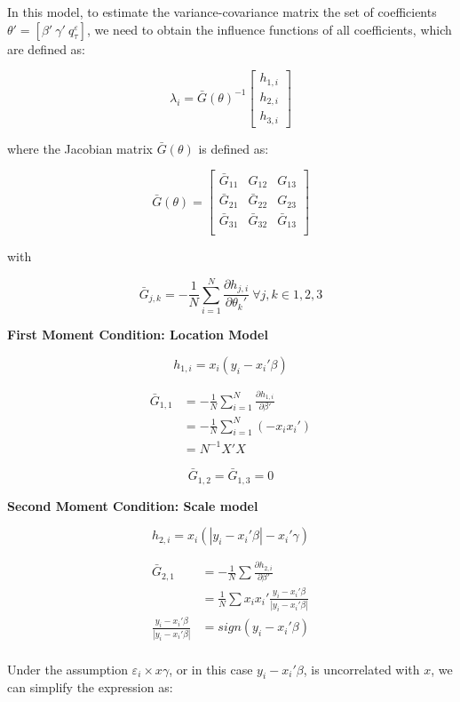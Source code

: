 \documentclass[
  authoryear,
  review,
  1p]{elsarticle}
\begin{document}
In this model, to estimate the variance-covariance matrix the set of
coefficients \(\theta'=[\beta' \ \gamma' \ q^\varepsilon_\tau]\), we
need to obtain the influence functions of all coefficients, which are
defined as:

\[\lambda_i = \bar G(\theta)^{-1}
\begin{bmatrix}
h_{1,i} \\
h_{2,i} \\
h_{3,i}
\end{bmatrix}
\]

where the Jacobian matrix \(\bar G(\theta)\) is defined as:

\[\bar G(\theta) = \begin{bmatrix}
\bar G_{11} & G_{12} & G_{13} \\
\bar G_{21} & \bar G_{22} & G_{23} \\
\bar G_{31} & \bar G_{32} & \bar G_{13} \\
\end{bmatrix}
\]

with

\[\bar G_{j,k} = - \frac 1 N \sum_{i=1}^N \frac{\partial h_{j,i}}{\partial \theta_k'} \ \forall j,k \in 1,2,3
\]

\textbf{First Moment Condition: Location Model}

\[h_{1,i}=x_i(y_i-x_i'\beta)\]

\[\begin{aligned}
\bar G_{1,1} &=- \frac{1}{N} \sum_{i=1}^N \frac{\partial h_{1,i}}{\partial \beta'} \\
             &=- \frac{1}{N} \sum_{i=1}^N (-x_i x_i') \\
             &= N^{-1} X'X
\end{aligned}
\]

\[
\bar G_{1,2} = \bar G_{1,3} = 0
\]

\textbf{Second Moment Condition: Scale model}

\[h_{2,i}=x_i(|y_i-x_i'\beta|-x_i'\gamma)\]

\[\begin{aligned}
\bar G_{2,1} &= -\frac{1}{N} \sum \frac{\partial h_{2,i}}{\partial \beta'} \\
             &=  \frac{1}{N} \sum x_i x_i' \frac{y_i-x_i'\beta}{|y_i-x_i'\beta|} \\
\frac{y_i-x_i'\beta}{|y_i-x_i'\beta|} &= sign(y_i-x_i'\beta) \\            
\end{aligned}
\]

Under the assumption \(\varepsilon_i \times x\gamma\), or in this case
\(y_i-x_i'\beta\), is uncorrelated with \(x\), we can simplify the
expression as:
\end{document}
